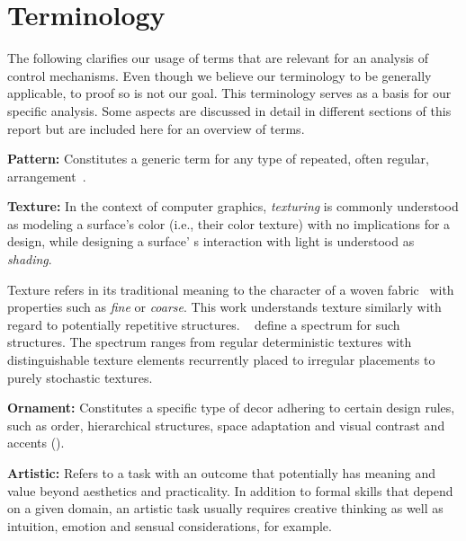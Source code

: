 
\section{Terminology}
\label{terminology}

The following clarifies our usage of terms that are relevant for an analysis of control mechanisms. Even though we believe our terminology to be generally applicable, to proof so is not our goal. This terminology serves as a basis for our specific analysis. Some aspects are discussed in detail in different sections of this report but are included here for an overview of terms.

\textbf{Pattern:} Constitutes a generic term for any type of repeated, often regular, arrangement~\cite{oed_2017}.

\textbf{Texture:} \label{par:taxo_terminology_texture}In the context of computer graphics, \textit{texturing} is commonly understood as modeling a surface's color (i.e., their color texture) with no implications for a design, while designing a surface' s interaction with light is understood as \textit{shading}. 

Texture refers in its traditional meaning to the character of a woven fabric~\cite{oed_2017} with properties such as \textit{fine} or \textit{coarse}. This work understands texture similarly with regard to potentially repetitive structures. \citeauthor*{lin_2006_qeo}~\cite{lin_2006_qeo} define a spectrum for such structures. The spectrum ranges from regular deterministic textures with distinguishable texture elements recurrently placed to irregular placements to purely stochastic textures.


\textbf{Ornament:} Constitutes a specific type of decor adhering to certain design rules, such as order, hierarchical structures, space adaptation and visual contrast and accents ().

\textbf{Artistic:} Refers to a task with an outcome that potentially has meaning and value beyond aesthetics and practicality. In addition to formal skills that depend on a given domain, an artistic task usually requires creative thinking as well as intuition, emotion and sensual considerations, for example.

